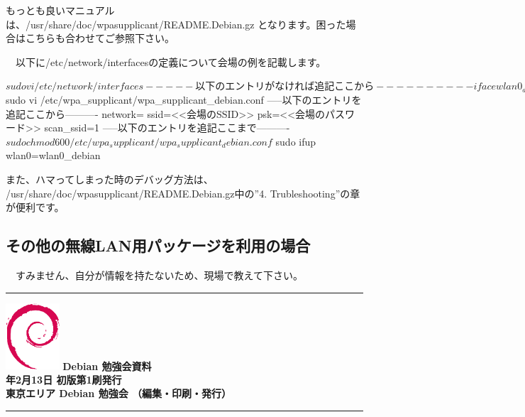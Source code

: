 \documentclass[mingoth,a4paper]{jsarticle}
\newcommand{\debmtgyear}{2016}
\newcommand{\debmtgmonth}{2}
\newcommand{\debmtgdate}{13}
\begin{document}
 もっとも良いマニュアルは、/usr/share/doc/wpasupplicant/README.Debian.gz
となります。困った場合はこちらも合わせてご参照下さい。

　以下に/etc/network/interfacesの定義について会場の例を記載します。

\begin{commandline}
$ sudo vi /etc/network/interfaces
-----以下のエントリがなければ追記ここから----------
iface wlan0_debian inet dhcp
     wpa-conf /etc/wpa_supplicant/wpa_supplicant_debian.conf
-----以下のエントリがなければ追記ここまで----------
$ sudo vi /etc/wpa_supplicant/wpa_supplicant_debian.conf
-----以下のエントリを追記ここから----------
network={
     ssid=<<会場のSSID>>
     psk=<<会場のパスワード>>
     scan_ssid=1
}
-----以下のエントリを追記ここまで----------
$ sudo chmod 600 /etc/wpa_supplicant/wpa_supplicant_debian.conf
$ sudo ifup wlan0=wlan0_debian
\end{commandline}

 また、ハマってしまった時のデバッグ方法は、
/usr/share/doc/wpasupplicant/README.Debian.gz中の''4. Trubleshooting''の章が便利です。

 \subsection{その他の無線LAN用パッケージを利用の場合}

　すみません、自分が情報を持たないため、現場で教えて下さい。

\fi

\cleartooddpage

\vspace*{15cm}
\hrule
\vspace{2mm}
\includegraphics[width=2cm]{image200502/openlogo-nd.eps}
\noindent \Large \bf Debian 勉強会資料\\
\noindent \normalfont \debmtgyear{}年\debmtgmonth{}月\debmtgdate{}日 \hspace{5mm}  初版第1刷発行\\
\noindent \normalfont 東京エリア Debian 勉強会 （編集・印刷・発行）\\
\hrule
\end{document}
